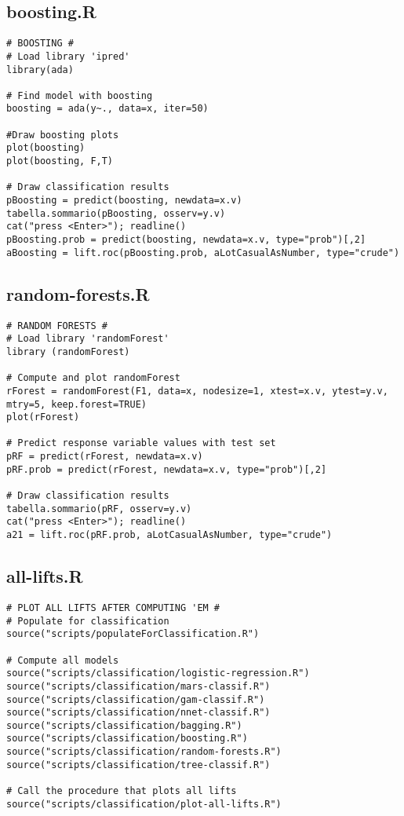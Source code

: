 \subsection{boosting.R}\label{sec:script-boosting}
\begin{verbatim}
# BOOSTING #
# Load library 'ipred'
library(ada)

# Find model with boosting
boosting = ada(y~., data=x, iter=50)

#Draw boosting plots
plot(boosting)
plot(boosting, F,T)

# Draw classification results
pBoosting = predict(boosting, newdata=x.v)
tabella.sommario(pBoosting, osserv=y.v)
cat("press <Enter>"); readline()
pBoosting.prob = predict(boosting, newdata=x.v, type="prob")[,2]
aBoosting = lift.roc(pBoosting.prob, aLotCasualAsNumber, type="crude")
\end{verbatim}

\subsection{random-forests.R}\label{sec:script-rForests}
\begin{verbatim}
# RANDOM FORESTS #
# Load library 'randomForest'
library (randomForest)

# Compute and plot randomForest
rForest = randomForest(F1, data=x, nodesize=1, xtest=x.v, ytest=y.v, mtry=5, keep.forest=TRUE)
plot(rForest)

# Predict response variable values with test set
pRF = predict(rForest, newdata=x.v)
pRF.prob = predict(rForest, newdata=x.v, type="prob")[,2]

# Draw classification results
tabella.sommario(pRF, osserv=y.v)
cat("press <Enter>"); readline()
a21 = lift.roc(pRF.prob, aLotCasualAsNumber, type="crude")
\end{verbatim}

\subsection{all-lifts.R}\label{sec:script-all-lifts}
\begin{verbatim}
# PLOT ALL LIFTS AFTER COMPUTING 'EM #
# Populate for classification
source("scripts/populateForClassification.R")

# Compute all models
source("scripts/classification/logistic-regression.R")
source("scripts/classification/mars-classif.R")
source("scripts/classification/gam-classif.R")
source("scripts/classification/nnet-classif.R")
source("scripts/classification/bagging.R")
source("scripts/classification/boosting.R")
source("scripts/classification/random-forests.R")
source("scripts/classification/tree-classif.R")

# Call the procedure that plots all lifts
source("scripts/classification/plot-all-lifts.R")
\end{verbatim}

